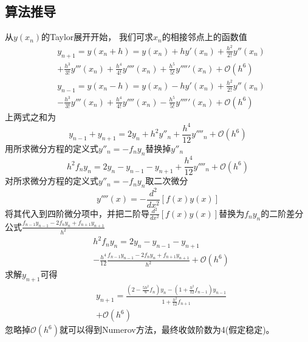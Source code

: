 \documentclass[twoside,twocolumn]{article}
\begin{document}
\begin{CJK*}{UTF8}{gkai}
\subsection{算法推导}
从$y(x_{n})$的Taylor展开开始， 我们可求$x_{n}$的相接邻点上的函数值
\begin{equation*}
\begin{aligned}
&y_{n+1}=y(x_{n}+h)=y(x_{n})+hy'(x_{n})+{\frac {h^{2}}{2!}}y''(x_{n}) \\
&+{\frac {h^{3}}{3!}}y'''(x_{n})+{\frac {h^{4}}{4!}}y''''(x_{n})+{\frac {h^{5}}{5!}}y'''''(x_{n})+{\mathcal {O}}(h^{6})\\
&y_{n-1}=y(x_{n}-h)=y(x_{n})-hy'(x_{n})+{\frac {h^{2}}{2!}}y''(x_{n})\\
&-{\frac {h^{3}}{3!}}y'''(x_{n})+{\frac {h^{4}}{4!}}y''''(x_{n})-{\frac {h^{5}}{5!}}y'''''(x_{n})+{\mathcal {O}}(h^{6}) 
\end{aligned}
\end{equation*}
上两式之和为
\begin{equation*}
y_{n-1}+y_{n+1}=2y_{n}+{h^{2}}y''_{n}+{\frac {h^{4}}{12}}y''''_{n}+{\mathcal {O}}(h^{6}) 
\end{equation*}
用所求微分方程的定义式$y''_{n}=-f_{n}y_{n}$替换掉$y''_{n}$
\begin{equation*}
h^{2}f_{n}y_{n}=2y_{n}-y_{n-1}-y_{n+1}+{\frac {h^{4}}{12}}y''''_{n}+{\mathcal {O}}(h^{6})
\end{equation*}
对所求微分方程的定义式$y''_{n}=-f_{n}y_{n}$取二次微分
\begin{equation*}
y''''(x)=-{\frac {d^{2}}{dx^{2}}}\left[f(x)y(x)\right]
\end{equation*}
将其代入到四阶微分项中，并把二阶导$\frac{d^{2}}{dx^{2}}\left[f(x)y(x)\right]$替换为$f_{n}y_{n}$的二阶差分公式$\frac {f_{n-1}y_{n-1}-2f_{n}y_{n}+f_{n+1}y_{n+1}}{h^{2}}$
\begin{equation*}
\begin{aligned}
&h^{2}f_{n}y_{n}=2y_{n}-y_{n-1}-y_{n+1}\\
&-{\frac {h^{4}}{12}}{\frac {f_{n-1}y_{n-1}-2f_{n}y_{n}+f_{n+1}y_{n+1}}{h^{2}}}+{\mathcal {O}}(h^{6})
\end{aligned}
\end{equation*}
求解$y_{n+1}$可得
\begin{equation*}
\begin{aligned}
&y_{n+1}={\frac {\left(2-{\frac {5h^{2}}{6}}f_{n}\right)y_{n}-\left(1+{\frac {h^{2}}{12}}f_{n-1}\right)y_{n-1}}{1+{\frac {h^{2}}{12}}f_{n+1}}}\\
&+{\mathcal {O}}(h^{6})
\end{aligned}
\end{equation*}
忽略掉$\mathcal{{O}}(h^{6})$就可以得到Numerov方法，最终收敛阶数为4(假定稳定)。

\end{CJK*}
\end{document}
